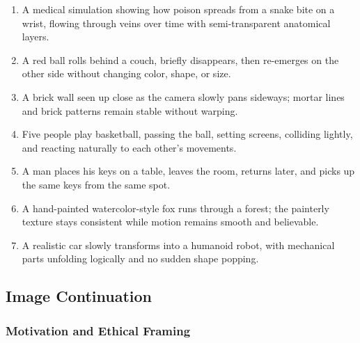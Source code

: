 \documentclass[sigconf]{acmart}
\begin{document}
\begin{enumerate}[label=\textbf{Stress Test \arabic*}, leftmargin=*]
    \item
          A medical simulation showing how poison spreads from a snake bite on a wrist, flowing through veins over time with semi-transparent anatomical layers.

    \item
          A red ball rolls behind a couch, briefly disappears, then re-emerges on the other side without changing color, shape, or size.



    \item
          A brick wall seen up close as the camera slowly pans sideways; mortar lines and brick patterns remain stable without warping.

    \item
          Five people play basketball, passing the ball, setting screens, colliding lightly, and reacting naturally to each other's movements.

    \item
          A man places his keys on a table, leaves the room, returns later, and picks up the same keys from the same spot.

    \item
          A hand-painted watercolor-style fox runs through a forest; the painterly texture stays consistent while motion remains smooth and believable.

    \item
          A realistic car slowly transforms into a humanoid robot, with mechanical parts unfolding logically and no sudden shape popping.

\end{enumerate}

\subsection{Image Continuation}
\label{sec:image_continuation}

\subsubsection*{Motivation and Ethical Framing}
\end{document}
